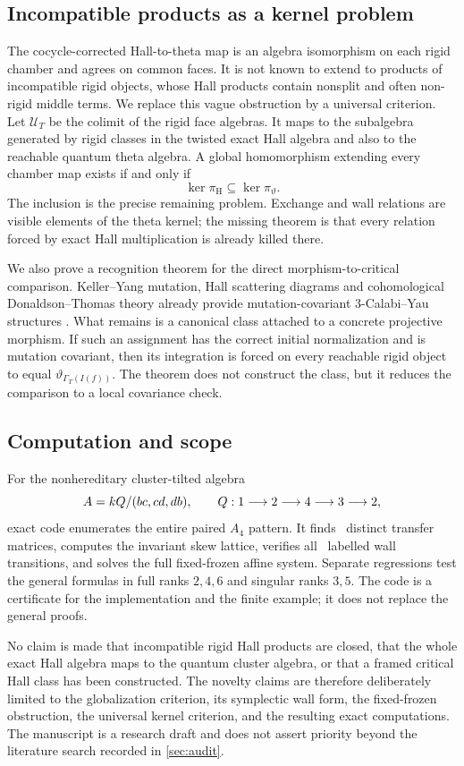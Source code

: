 \subsection*{Incompatible products as a kernel problem}

The cocycle-corrected Hall-to-theta map is an algebra isomorphism on each
rigid chamber and agrees on common faces.  It is not known to extend to
products of incompatible rigid objects, whose Hall products contain nonsplit
and often non-rigid middle terms.  We replace this vague obstruction by a
universal criterion.  Let $\mathscr U_T$ be the colimit of the rigid face
algebras.  It maps to the subalgebra generated by rigid classes in the twisted
exact Hall algebra and also to the reachable quantum theta algebra.  A global
homomorphism extending every chamber map exists if and only if
\[
 \ker\pi_{\mathrm H}\subseteq\ker\pi_\vartheta.
\]
The inclusion is the precise remaining problem.  Exchange and wall relations
are visible elements of the theta kernel; the missing theorem is that every
relation forced by exact Hall multiplication is already killed there.

We also prove a recognition theorem for the direct morphism-to-critical
comparison.  Keller--Yang mutation, Hall scattering diagrams and
cohomological Donaldson--Thomas theory already provide mutation-covariant
$3$-Calabi--Yau structures \cite{KellerYang,BridgelandScattering,Davison}.
What remains is a canonical class attached to a concrete projective
morphism.  If such an assignment has the correct initial normalization and is
mutation covariant, then its integration is forced on every reachable rigid
object to equal $\vartheta_{\Gamma_T(I(f))}$.  The theorem does not construct
the class, but it reduces the comparison to a local covariance check.

\subsection*{Computation and scope}

For the nonhereditary cluster-tilted algebra
\[
 A=k Q/(bc,cd,db),
 \qquad
 Q:1\longrightarrow2\longrightarrow4\longrightarrow3\longrightarrow2,
\]
exact code enumerates the entire paired $A_4$ pattern.  It finds
\AIVTransferMatrices\ distinct transfer matrices, computes the invariant
skew lattice, verifies all \AIVOrientedMutations\ labelled wall transitions,
and solves the full fixed-frozen affine system.  Separate regressions test the
general formulas in full ranks $2,4,6$ and singular ranks $3,5$.  The code is
a certificate for the implementation and the finite example; it does not
replace the general proofs.

No claim is made that incompatible rigid Hall products are closed, that the
whole exact Hall algebra maps to the quantum cluster algebra, or that a
framed critical Hall class has been constructed.  The novelty claims are
therefore deliberately limited to the globalization criterion, its
symplectic wall form, the fixed-frozen obstruction, the universal kernel
criterion, and the resulting exact computations.  The manuscript is a
research draft and does not assert priority beyond the literature search
recorded in \cref{sec:audit}.

